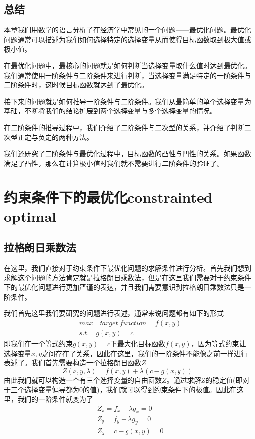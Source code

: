 \documentclass[UTF8,12pt]{ctexart}
\numberwithin{equation}{section} %
\numberwithin{figure}{section}
\numberwithin{table}{section}
\begin{document}
	\subsection{总结}
	
	本章我们用数学的语言分析了在经济学中常见的一个问题——最优化问题。最优化问题通常可以描述为我们如何选择特定的选择变量从而使得目标函数取到极大值或极小值。
	
	在最优化问题中，最核心的问题就是如何判断当选择变量取什么值时达到最优化。我们通常使用一阶条件与二阶条件来进行判断，当选择变量满足特定的一阶条件与二阶条件时，这时候目标函数就达到了最优化。
	
	接下来的问题就是如何推导一阶条件与二阶条件。我们从最简单的单个选择变量为基础，不断将我们的结论扩展到两个选择变量与多个选择变量的情况。
	
	在二阶条件的推导过程中，我们介绍了二阶条件与二次型的关系，并介绍了判断二次型正定与负定的两种方法。
	
	我们还研究了二阶条件与最优化过程中，目标函数的凸性与凹性的关系。如果函数满足了凸性，那么在计算极小值时我们就不需要进行二阶条件的验证了。
	
	\newpage
	
	\section{约束条件下的最优化constrainted optimal}
	\subsection{拉格朗日乘数法}
	
	在这里，我们直接对于约束条件下最优化问题的求解条件进行分析。首先我们想到求解这个问题的方法肯定就是拉格朗日乘数法，但是在这里我们需要对于约束条件下的最优化问题进行更加严谨的表达，并且我们需要意识到拉格朗日乘数法只是一阶条件。
	
	我们首先这里我们要研究的问题进行表述，通常来说问题都有如下的形式
	\begin{align}
		&max \quad target \ function = f(x,y) \\
		&s.t. \quad g(x,y) = c
	\end{align}
	即我们在一个等式约束$g(x,y) = c$下最大化目标函数$f(x,y)$，因为等式约束让选择变量$x,y$之间存在了关系，因此在这里，我们的一阶条件不能像之前一样进行表述了。我们首先需要构造一个拉格朗日函数$Z$
	\begin{equation}
		Z(x,y,\lambda) = f(x,y) + \lambda(c - g(x,y))
	\end{equation}
	由此我们就可以构造一个有三个选择变量的自由函数$Z$。通过求解$Z$的稳定值(即对于三个选择变量偏导都为0的值)，我们就可以得到约束条件下的极值。因此在这里，我们的一阶条件就变为了
	\begin{equation}
		\begin{aligned}
			&Z_x = f_x - \lambda g_x = 0 \\
			&Z_y = f_y - \lambda g_y = 0 \\
			&Z_{\lambda} = c - g(x,y) = 0
		\end{aligned}
		\label{condition}
	\end{equation}
\end{document}
